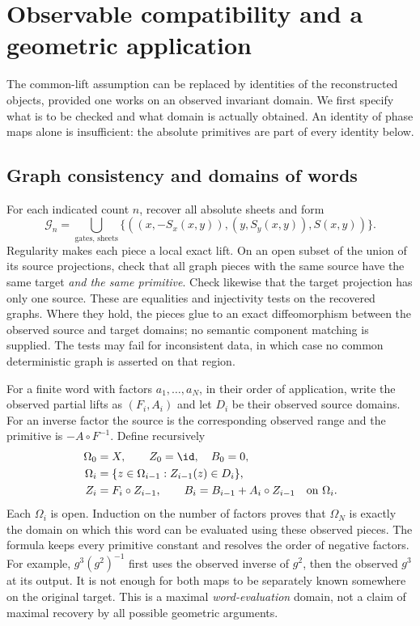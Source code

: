 \section{Observable compatibility and a geometric application}
\label{sec:v84-observed-geometry}
The common-lift assumption can be replaced by identities of the
reconstructed objects, provided one works on an observed invariant
domain. We first specify what is to be checked and what domain is
actually obtained. An identity of phase maps alone is insufficient:
the absolute primitives are part of every identity below.

\subsection{Graph consistency and domains of words}
For each indicated count $n$, recover all absolute sheets and form
\[
 \mathcal G_n=\bigcup_{\text{gates, sheets}}
 \{((x,-S_x(x,y)),(y,S_y(x,y)),S(x,y))\}.
\]
Regularity makes each piece a local exact lift. On an open subset of
the union of its source projections, check that all graph pieces with
the same source have the same target \emph{and the same primitive}.
Check likewise that the target projection has only one source. These
are equalities and injectivity tests on the recovered graphs. Where
they hold, the pieces glue to an exact diffeomorphism between the
observed source and target domains; no semantic component matching is
supplied. The tests may fail for inconsistent data, in which case no
common deterministic graph is asserted on that region.

For a finite word with factors $a_1,\ldots,a_N$, in their order of
application, write the observed partial lifts as $(F_i,A_i)$ and
let $D_i$ be their observed source domains. For an inverse factor the
source is the corresponding observed range and the primitive is
$-A\circ F^{-1}$. Define recursively
\begin{equation}\label{eq:v84-word-domain}
 \begin{split}
 \Omega_0&=X,\qquad Z_0=\id,\quad B_0=0,\\
 \Omega_i&=\{z\in\Omega_{i-1}:Z_{i-1}(z)\in D_i\},\\
 Z_i&=F_i\circ Z_{i-1},\qquad
 B_i=B_{i-1}+A_i\circ Z_{i-1}\quad\hbox{on }\Omega_i.
 \end{split}
\end{equation}
Each $\Omega_i$ is open. Induction on the number of factors proves
that $\Omega_N$ is exactly the domain on which this word can be
evaluated using these observed pieces. The formula keeps every
primitive constant and resolves the order of negative factors.
For example, $g^3(g^2)^{-1}$ first uses the observed inverse of $g^2$,
then the observed $g^3$ at its output. It is not enough for both maps
to be separately known somewhere on the original target.
This is a maximal \emph{word-evaluation} domain, not a claim of
maximal recovery by all possible geometric arguments.

